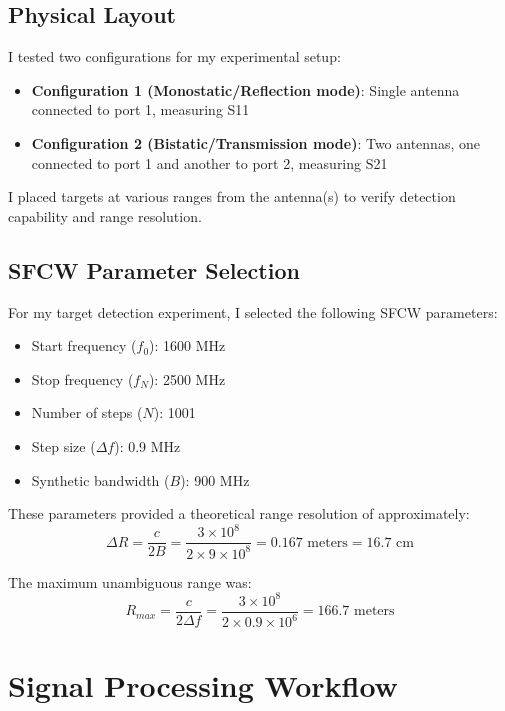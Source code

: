 \documentclass[11pt,a4paper]{article}
\begin{document}
\subsection{Physical Layout}

I tested two configurations for my experimental setup:

\begin{itemize}
    \item \textbf{Configuration 1 (Monostatic/Reflection mode)}: Single antenna connected to port 1, measuring S11
    \item \textbf{Configuration 2 (Bistatic/Transmission mode)}: Two antennas, one connected to port 1 and another to port 2, measuring S21
\end{itemize}

I placed targets at various ranges from the antenna(s) to verify detection capability and range resolution.

\subsection{SFCW Parameter Selection}

For my target detection experiment, I selected the following SFCW parameters:

\begin{itemize}
    \item Start frequency ($f_0$): 1600 MHz
    \item Stop frequency ($f_N$): 2500 MHz
    \item Number of steps ($N$): 1001
    \item Step size ($\Delta f$): 0.9 MHz
    \item Synthetic bandwidth ($B$): 900 MHz
\end{itemize}

These parameters provided a theoretical range resolution of approximately:
\begin{equation}
    \Delta R = \frac{c}{2B} = \frac{3 \times 10^8}{2 \times 9 \times 10^8} = 0.167 \text{ meters} = 16.7 \text{ cm}
\end{equation}

The maximum unambiguous range was:
\begin{equation}
    R_{max} = \frac{c}{2\Delta f} = \frac{3 \times 10^8}{2 \times 0.9 \times 10^6} = 166.7 \text{ meters}
\end{equation}

\section{Signal Processing Workflow}
\end{document}
